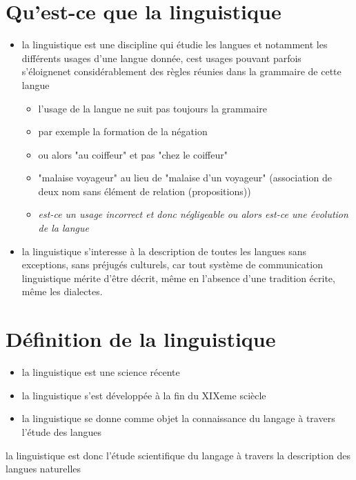 \section{Qu'est-ce que la linguistique}
\begin{itemize}
   \item la linguistique est une discipline qui étudie les langues et notamment les différents usages d'une langue donnée, cest usages pouvant parfois s'éloignenet considérablement des règles réunies dans la grammaire de cette langue
      \begin{itemize} 
         \item l'usage de la langue ne suit pas toujours la grammaire
         \item par exemple la formation de la négation 
         \item ou alors "au coiffeur" et pas "chez le coiffeur"
         \item "malaise voyageur" au lieu de "malaise d'un voyageur" (association de deux nom sans élément de relation (propositions))
         \item   \textit{est-ce un usage incorrect et donc négligeable ou alors est-ce une évolution de la langue}
      \end{itemize}
   \item la linguistique s'interesse à la description de toutes les langues sans exceptions, sans préjugés culturels, car tout système de communication linguistique mérite d'être décrit, même en l'absence d'une tradition écrite, même les dialectes.
\end{itemize}
\section{Définition de la linguistique}
\begin{itemize}
   \item la linguistique est une science récente
   \item la linguistique s'est développée à la fin du XIXeme sciècle
   \item la linguistique se donne comme objet la connaissance du langage à travers l'étude des langues
\end{itemize}
la linguistique est donc l'étude scientifique du langage à travers la description des langues naturelles

